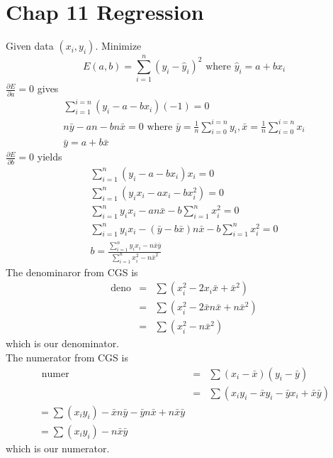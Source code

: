 \documentclass{article}
\newcommand{\beq}{\begin{equation}}
\newcommand{\eeq}{\end{equation}}
\newcommand{\ber}{\begin{eqnarray}}
\newcommand{\eer}{\end{eqnarray}}
\newcommand{\pdd}[2]{\frac{\partial{#1}}{\partial{#2}}}
\begin{document}
\section{Chap 11 Regression}
Given data $(x_i,y_i)$. Minimize
\beq
E(a,b) = \sum_{i=1}^{n}(y_i - \hat{y}_i)^2 \text{ where } \hat{y}_i = a +bx_i
\eeq
$\pdd{E}{a}=0$ gives
\ber
\sum_{i=1}^{i=n}(y_i-a-bx_i)(-1) = 0 \\
n\bar{y} - an -bn\bar{x} = 0 \text{ where } \bar{y} = \frac{1}{n}\sum_{i=0}^{i=n}y_i, \bar{x} = \frac{1}{n}\sum_{i=0}^{i=n}x_i \\
\bar{y} = a + b\bar{x}  
\eer
$\pdd{E}{b}=0$ yields
\ber
\sum_{i=1}^{n}(y_i - a - bx_i)x_i = 0 \\
\sum_{i=1}^{n}(y_ix_i - ax_i -bx_i^2) = 0\\
\sum_{i=1}^{n}y_ix_i - an\bar{x} - b\sum_{i=1}^n x_i^2 = 0\\
\sum_{i=1}^{n}y_ix_i - ( \bar{y} - b\bar{x})n\bar{x} - b\sum_{i=1}^n x_i^2=0\\
b = \frac{\sum_{i=1}^{n}y_ix_i-n\bar{x}\bar{y}}{\sum_{i=1}^{n}x_i^2- n\bar{x}^2}
\eer
The denominaror from CGS is
\ber
\text{deno} &=& \sum( x_i^2 - 2x_i\bar{x} + \bar{x}^2) \\
&=& \sum ( x_i^2 - 2\bar{x}n\bar{x} + n\bar{x}^2) \\
&=& \sum ( x_i^2 - n\bar{x}^2)
\eer
which is our denominator.\\
The numerator from CGS is
\ber
\text{ numer } &=& \sum(x_i-\bar{x})(y_i-\bar{y})\\
&=& \sum(x_iy_i - \bar{x}y_i -\bar{y}x_i + \bar{x}\bar{y})\\
=\sum(x_iy_i) - \bar{x}n\bar{y}  - \bar{y}n\bar{x} + n\bar{x}\bar{y} \\
=\sum(x_iy_i) - n\bar{x}\bar{y}
\eer
which is our numerator.
\end{document}
